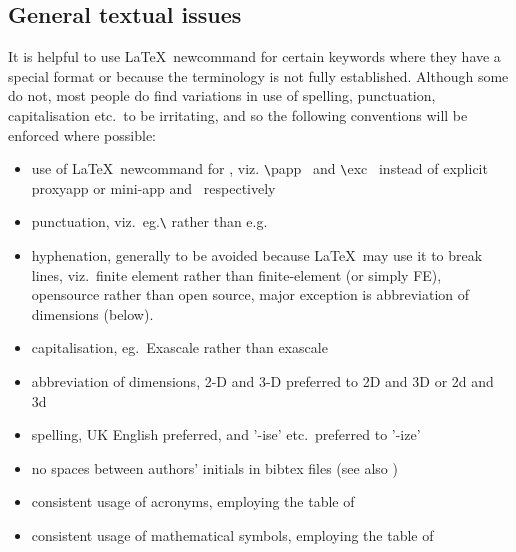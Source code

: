 \subsection{General textual issues}\label{sec:REF_text}
It is helpful to use \LaTeX \ newcommand for certain keywords where they have a special
format or because the terminology is not fully established. Although some do not, most
people do find variations in use of spelling, punctuation, capitalisation etc.\ to be irritating,
and so the following conventions will be enforced where possible: 
\begin{itemize}
\item use of \LaTeX \ newcommand for , viz. \verb-\-papp \ and  \verb-\-exc \ instead of explicit
proxyapp or mini-app and \exc \  respectively
\item punctuation, viz.\ eg.\verb-\- rather than e.g.
\item hyphenation, generally to be avoided because \LaTeX \ may use it to break lines, viz.\ finite element rather than finite-element (or simply FE), opensource rather than open source, major exception is abbreviation of dimensions (below).
\item capitalisation, eg.\ Exascale rather than exascale
\item abbreviation of dimensions, 2-D and 3-D preferred to 2D and 3D or 2d and 3d
\item spelling, UK English preferred, and  '-ise' etc.\ preferred to '-ize'
\item no spaces between authors' initials in bibtex files (see also )
\item consistent usage of acronyms, employing the table of 
\item consistent usage of mathematical symbols, employing the table of 
\end{itemize}

